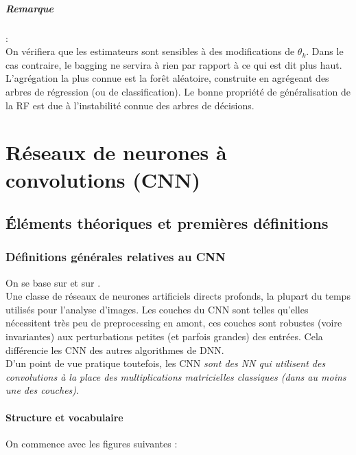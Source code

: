 \documentclass[a4paper,12pt]{report}
\newcommand\bk{\color{black}}
\newcommand\brick{\color{brick}}
\newcommand\navy{\color{navy}}
\numberwithin{equation}{section} %
\begin{document}
\paragraph*{Remarque }:\\
On vérifiera que les estimateurs sont sensibles à des modifications de $\theta_k$. Dans le cas contraire, le bagging ne servira à rien par rapport à ce qui est dit plus haut. \\
 L'agrégation la plus connue est la forêt aléatoire, construite en agrégeant des arbres de régression (ou de classification). Le bonne propriété de généralisation de la RF est due à l'instabilité connue des arbres de décisions.

\newpage

\navy \chapter{Réseaux de neurones à convolutions (CNN)} \bk
\section{Éléments théoriques et premières définitions}
\brick \subsection{Définitions générales relatives au CNN} \bk
On se base sur \citep{nielsen2015neural} et sur \citep{Goodfellow-et-al-2016}.\\
Une classe de réseaux de neurones artificiels directs profonds, la plupart du temps utilisés pour l'analyse d'images. Les couches du CNN sont telles qu'elles nécessitent très peu de preprocessing en amont, ces couches sont robustes (voire invariantes) aux perturbations petites (et parfois grandes) des entrées. Cela différencie les CNN des autres algorithmes de DNN. \\
D'un point de vue pratique toutefois, les CNN \textit{sont des NN qui utilisent des convolutions à la place des multiplications matricielles classiques (dans au moins une des couches)}.

\navy \subsubsection{Structure et vocabulaire} \bk
On commence avec les figures suivantes :
\end{document}
